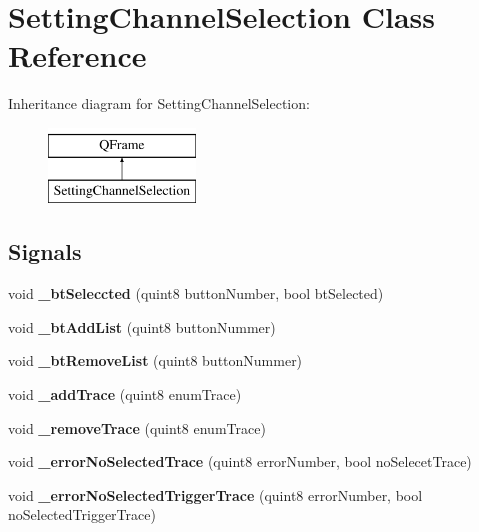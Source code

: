\hypertarget{class_setting_channel_selection}{}\section{Setting\+Channel\+Selection Class Reference}
\label{class_setting_channel_selection}
Inheritance diagram for Setting\+Channel\+Selection\+:\begin{figure}[H]
\begin{center}
\leavevmode
\includegraphics[height=2.000000cm]{class_setting_channel_selection}
\end{center}
\end{figure}
\subsection*{Signals}
\begin{DoxyCompactItemize}
\item 
\mbox{\label{class_setting_channel_selection_aef1a5cd923ddca50637a1a67339b326f}} 
void {\bfseries \+\_\+bt\+Seleccted} (quint8 button\+Number, bool bt\+Selected)
\item 
\mbox{\label{class_setting_channel_selection_aeee09ccbe7cf1b6b91dc30ed0137a62d}} 
void {\bfseries \+\_\+bt\+Add\+List} (quint8 button\+Nummer)
\item 
\mbox{\label{class_setting_channel_selection_ac90a18240735442a4f320a3273eabbe6}} 
void {\bfseries \+\_\+bt\+Remove\+List} (quint8 button\+Nummer)
\item 
\mbox{\label{class_setting_channel_selection_a70e674dd70a01636a52cecaf2303bf47}} 
void {\bfseries \+\_\+add\+Trace} (quint8 enum\+Trace)
\item 
\mbox{\label{class_setting_channel_selection_a4caedf818b9e93210df2e1bf2d5da8c2}} 
void {\bfseries \+\_\+remove\+Trace} (quint8 enum\+Trace)
\item 
\mbox{\label{class_setting_channel_selection_af23e9c99fcc9637d6bcdc2ea41fe8d84}} 
void {\bfseries \+\_\+error\+No\+Selected\+Trace} (quint8 error\+Number, bool no\+Selecet\+Trace)
\item 
\mbox{\label{class_setting_channel_selection_a8d7f6a3d5460699b4f622ab7a443408f}} 
void {\bfseries \+\_\+error\+No\+Selected\+Trigger\+Trace} (quint8 error\+Number, bool no\+Selected\+Trigger\+Trace)
\end{DoxyCompactItemize}
